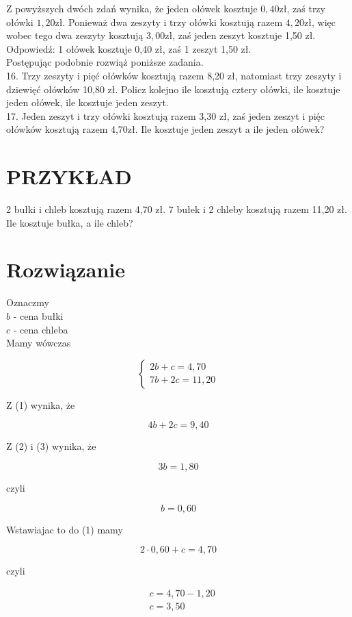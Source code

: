 \documentclass[10pt]{article}
\begin{document}
Z powyższych dwóch zdań wynika, że jeden ołówek kosztuje \(0,40 \mathrm{zł}\), zaś trzy\\
ołówki \(1,20 \mathrm{zł}\). Ponieważ dwa zeszyty i trzy ołówki kosztują razem \(4,20 \mathrm{zł}\), więc wobec tego dwa zeszyty kosztują \(3,00 \mathrm{zł}\), zaś jeden zeszyt kosztuje 1,50 zł.\\
Odpowiedź: 1 ołówek kosztuje 0,40 zł, zaś 1 zeszyt 1,50 zł.\\
Postępując podobnie rozwiąż poniższe zadania.\\
16. Trzy zeszyty i pięć ołówków kosztują razem 8,20 zł, natomiast trzy zeszyty i dziewięć ołówków 10,80 zł. Policz kolejno ile kosztują cztery ołówki, ile kosztuje jeden ołówek, ile kosztuje jeden zeszyt.\\
17. Jeden zeszyt i trzy ołówki kosztują razem 3,30 zł, zaś jeden zeszyt i pię́c ołówków kosztują razem 4,70zł. Ile kosztuje jeden zeszyt a ile jeden ołówek?

\section*{PRZYKŁAD}
2 bułki i chleb kosztują razem 4,70 zł. 7 bułek i 2 chleby kosztują razem 11,20 zł. Ile kosztuje bułka, a ile chleb?

\section*{Rozwiązanie}
Oznaczmy\\
\(b\) - cena bułki\\
\(c\) - cena chleba\\
Mamy wówczas

\[
\left\{\begin{array}{l}
2 b+c=4,70 \\
7 b+2 c=11,20
\end{array}\right.
\]

Z (1) wynika, że

\[
4 b+2 c=9,40
\]

Z (2) i (3) wynika, że

\[
3 b=1,80
\]

czyli

\[
b=0,60
\]

Wstawiajac to do (1) mamy

\[
2 \cdot 0,60+c=4,70
\]

czyli

\[
\begin{aligned}
& c=4,70-1,20 \\
& c=3,50
\end{aligned}
\]
\end{document}
